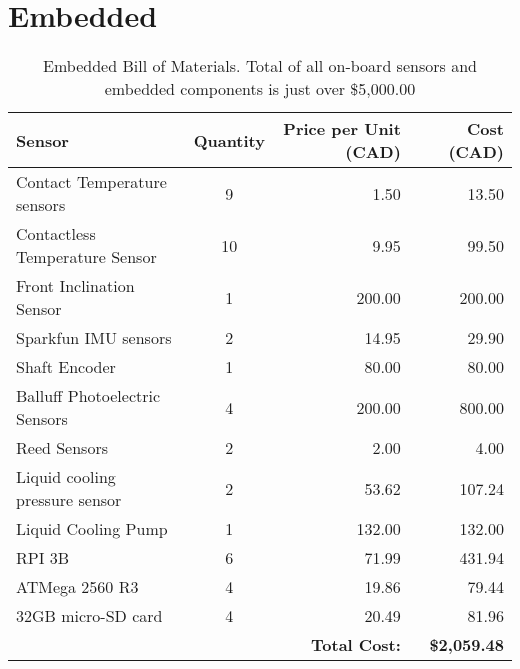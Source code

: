 \documentclass[main.tex]{subfiles}
\begin{document}
\section{Embedded}
\begin{table}[H]
  	  \centering
      \begin{tabular}{@{}lcrr@{}} \toprule
        Sensor & Quantity & Price per Unit (CAD) & Cost (CAD) \\ \midrule
        Contact Temperature sensors & 9 & 1.50 & 13.50 \\
        Contactless Temperature Sensor & 10 & 9.95 & 99.50 \\
        Front Inclination Sensor & 1 & 200.00 & 200.00 \\
        Sparkfun IMU sensors & 2 & 14.95 & 29.90 \\
        Shaft Encoder & 1 & 80.00 & 80.00 \\
        Balluff Photoelectric Sensors & 4 & 200.00 & 800.00 \\
        Reed Sensors & 2 & 2.00 & 4.00 \\
        Liquid cooling pressure sensor & 2 & 53.62 & 107.24 \\
        Liquid Cooling Pump & 1 & 132.00 & 132.00 \\
        RPI 3B & 6 & 71.99 & 431.94 \\
        ATMega 2560 R3 & 4 & 19.86 & 79.44 \\
        32GB micro-SD card & 4 & 20.49 & 81.96 \\ \midrule
        &  &  \textbf{Total Cost:} & \textbf{\$2,059.48} \\ \bottomrule
      \end{tabular}
      \caption{Embedded Bill of Materials. Total of all on-board sensors and embedded components is just over \$5,000.00}
      \label{tab:emb-bom}
\end{table}
\end{document}
